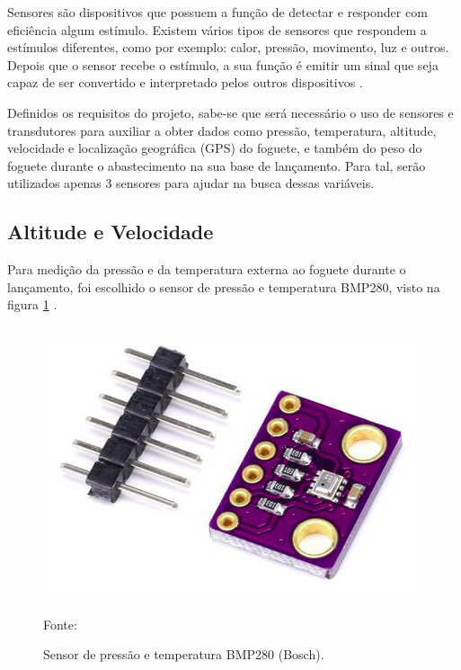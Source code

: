 \par Sensores são dispositivos que possuem a função de detectar e responder com eficiência algum estímulo. Existem vários tipos de sensores que respondem a estímulos diferentes, como por exemplo: calor, pressão, movimento, luz e outros. Depois que o sensor recebe o estímulo, a sua função é emitir um sinal que seja capaz de ser convertido e interpretado pelos outros dispositivos \cite{mattede_Sensores_blog2020}.

\par Definidos os requisitos do projeto, sabe-se que será necessário o uso de sensores e transdutores para auxiliar a obter dados como pressão, temperatura, altitude, velocidade e localização geográfica (GPS) do foguete, e também do peso do foguete durante o abastecimento na sua base de lançamento. Para tal, serão utilizados apenas 3 sensores para ajudar na busca dessas variáveis.

\subsection{Altitude e Velocidade}

\par Para medição da pressão e da temperatura externa ao foguete durante o lançamento, foi escolhido o sensor de pressão e temperatura BMP280, visto na figura \ref{fig:sensor_pressao} \cite{datasheet_BMP280}.

\begin{figure}[H]
  \centering
  \includegraphics[scale=0.75]{figuras/BMP280.png}
  \caption{Sensor de pressão e temperatura BMP280 (Bosch). }
 { \footnotesize Fonte:\cite{figura_BMP280}} 
  \label{fig:sensor_pressao}
\end{figure}

